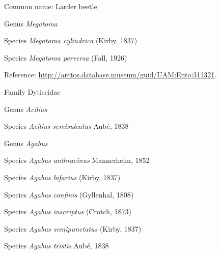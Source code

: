 \documentclass[9pt, article]{memoir}
\begin{document}
\begin{multicols}{2}
Common name: Larder beetle

\vspace{6pt}\noindent\hspace{30pt}Genus \textit{Megatoma}


\vspace{6pt}\noindent\hspace{36pt}Species \textit{Megatoma cylindrica} (Kirby, 1837)


\vspace{6pt}\noindent\hspace{36pt}Species \textit{Megatoma perversa} (Fall, 1926)


Reference: 
\url{http://arctos.database.museum/guid/UAM:Ento:311321}.

\vspace{6pt}\noindent\hspace{24pt}Family Dytiscidae


\vspace{6pt}\noindent\hspace{30pt}Genus \textit{Acilius}


\vspace{6pt}\noindent\hspace{36pt}Species \textit{Acilius semisulcatus} Aubé, 1838


\vspace{6pt}\noindent\hspace{30pt}Genus \textit{Agabus}


\vspace{6pt}\noindent\hspace{36pt}Species \textit{Agabus anthracinus} Mannerheim, 1852


\vspace{6pt}\noindent\hspace{36pt}Species \textit{Agabus bifarius} (Kirby, 1837)


\vspace{6pt}\noindent\hspace{36pt}Species \textit{Agabus confinis} (Gyllenhal, 1808)


\vspace{6pt}\noindent\hspace{36pt}Species \textit{Agabus inscriptus} (Crotch, 1873)


\vspace{6pt}\noindent\hspace{36pt}Species \textit{Agabus semipunctatus} (Kirby, 1837)


\vspace{6pt}\noindent\hspace{36pt}Species \textit{Agabus tristis} Aubé, 1838



\end{multicols}
\end{document}
